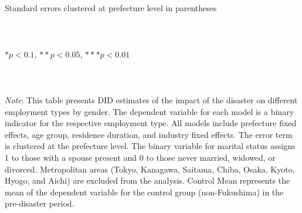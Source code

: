 \documentclass[serif, aspectratio=169]{beamer}
\begin{document}
\begin{frame}
\begin{table}[htbp]
{\begin{tabular}{@{}l*{14}{c}@{}}
\bottomrule
\end{tabular}}
\raggedright
\\\\{\linewidth}{\tiny Standard errors clustered at prefecture level in parentheses}\\\\
\\\\{\linewidth}{\tiny $*p<0.1$, $**p<0.05$, $***p<0.01$}\\\\
\\\\{\linewidth}{\tiny \textit{Note}: This table presents DID estimates of the impact of the disaster on different employment types by gender. The dependent variable for each model is a binary indicator for the respective employment type. All models include prefecture fixed effects, age group, residence duration, and industry fixed effects. The error term is clustered at the prefecture level. The binary variable for marital status assigns 1 to those with a spouse present and 0 to those never married, widowed, or divorced. Metropolitan areas (Tokyo, Kanagawa, Saitama, Chiba, Osaka, Kyoto, Hyogo, and Aichi) are excluded from the analysis. Control Mean represents the mean of the dependent variable for the control group (non-Fukushima) in the pre-disaster period.}
\end{table}


\end{frame}


\end{document}
